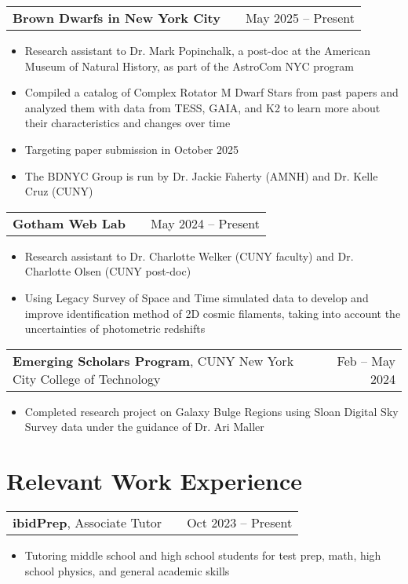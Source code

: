 \documentclass[a4paper,12pt]{article}
\makeatletter
\newenvironment{joblong}[2]
    {
    \begin{tabularx}{\linewidth}{@{}l X r@{}}
    #1 & \hfill &  #2 \\[3.75pt]
    \end{tabularx}
    \begin{minipage}[t]{\linewidth}
    \begin{itemize}[nosep,after=\strut, leftmargin=1em, itemsep=3pt,label=--]
    }
    {
    \end{itemize}
    \end{minipage}    
    }
\makeatother
\begin{document}
\begin{joblong}{\textbf{Brown Dwarfs in New York City}}{May 2025 -- Present}
\item Research assistant to Dr. Mark Popinchalk, a post-doc at the American Museum of Natural History, as part of the AstroCom NYC program
\item Compiled a catalog of Complex Rotator M Dwarf Stars from past papers and analyzed them with data from TESS, GAIA, and K2 to learn more about their characteristics and changes over time
\item Targeting paper submission in October 2025
\item The BDNYC Group is run by Dr. Jackie Faherty (AMNH) and Dr. Kelle Cruz (CUNY)
\end{joblong}

\begin{joblong}{\textbf{Gotham Web Lab}}{May 2024 -- Present}
\item Research assistant to Dr. Charlotte Welker (CUNY faculty) and Dr. Charlotte Olsen (CUNY post-doc)
\item Using Legacy Survey of Space and Time simulated data to develop and improve identification method of 2D cosmic filaments, taking into account the uncertainties of photometric redshifts
\end{joblong}

\begin{joblong}{\textbf{Emerging Scholars Program}, CUNY New York City College of Technology}{Feb -- May 2024}
\item Completed research project on Galaxy Bulge Regions using Sloan Digital Sky Survey data under the guidance of Dr. Ari Maller 
\end{joblong}
  
\section{Relevant Work Experience}

\begin{joblong}{\textbf{ibidPrep}, Associate Tutor}{Oct 2023 -- Present}
\item Tutoring middle school and high school students for test prep, math, high school physics, and general academic skills
\end{joblong}
\end{document}

